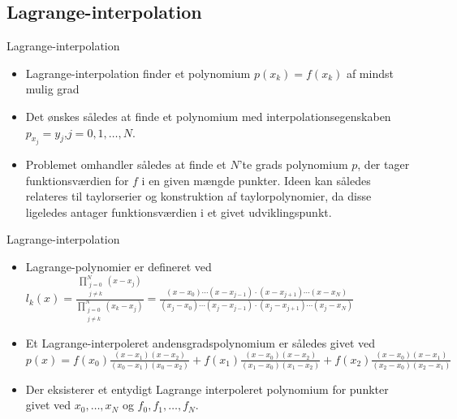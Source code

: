 \subsection{Lagrange-interpolation}
\begin{frame}{Lagrange-interpolation}
    \begin{itemize}
        \item Lagrange-interpolation finder et polynomium $p(x_k)=f(x_k)$ af mindst mulig grad %
        \item Det ønskes således at finde et polynomium med interpolationsegenskaben $p_{x_j}=y_j$,$j=0,1,\ldots,N$.

        \item Problemet omhandler således at finde et $N$'te grads polynomium $p$, der tager funktionsværdien for $f$ i en given mængde punkter. 
        Ideen kan således relateres til taylorserier og konstruktion af taylorpolynomier, da disse ligeledes antager funktionsværdien i et givet udviklingspunkt.
    \end{itemize}
\end{frame}
\begin{frame}{Lagrange-interpolation}
    \begin{itemize}
        \item Lagrange-polynomier er defineret ved \\
            $
            l_k(x)=\frac{\prod_{\substack{j=0 \\ {j \neq k}}}^{N}(x-x_j)}{\prod_{\substack{j=0 \\ {j \neq k}}}^{N}(x_k-x_j)}=\frac{(x-x_0) \cdots (x-x_{j-1}) \cdot (x-x_{j+1})\cdots(x-x_N)}{(x_j-x_0)\cdots (x_j-x_{j-1}) \cdot (x_j-x_{j+1})\cdots (x_j - x_N)}
            $
        \item Et Lagrange-interpoleret andensgradspolynomium er således givet ved $ p(x)=f(x_0)\frac{(x-x_1)(x-x_2)}{(x_0-x_1)(x_0-x_2)}+f(x_1)\frac{(x-x_0)(x-x_2)}{(x_1-x_0)(x_1-x_2)}+f(x_2)\frac{(x-x_0)(x-x_1)}{(x_2-x_0)(x_2-x_1)} $
        \item Der eksisterer et entydigt Lagrange interpoleret polynomium for punkter givet ved $x_0, \ldots, x_N$ og $f_0, f_1, \ldots , f_N$.
        
    \end{itemize}
\end{frame}
